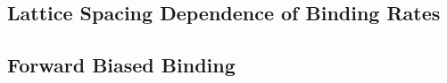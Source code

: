 \documentclass[
	11pt]{article}
\begin{document}
\begin{multicols}{2}
\subsection*{Lattice Spacing Dependence of Binding Rates}


\subsection*{Forward Biased Binding}


%

\end{multicols}
\end{document}
